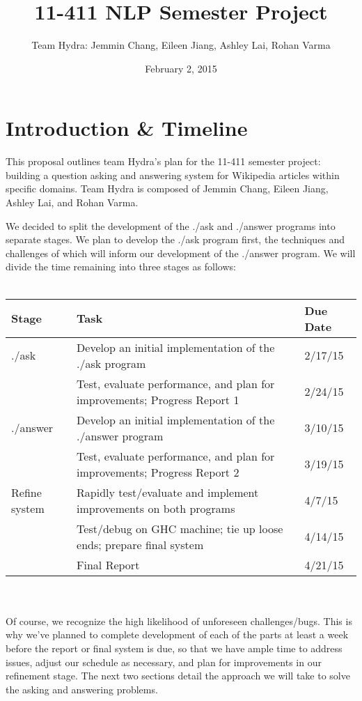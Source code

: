 \documentclass{article}
\begin{document}
\title{11-411 NLP Semester Project}
\date{February 2, 2015}
\author{Team Hydra: Jemmin Chang, Eileen Jiang, Ashley Lai, Rohan Varma}

\maketitle

\section{Introduction \& Timeline}
This proposal outlines team Hydra’s plan for the 11-411 semester project: building a question asking and answering system for Wikipedia articles within specific domains. Team Hydra is composed of Jemmin Chang, Eileen Jiang, Ashley Lai, and Rohan Varma.

We decided to split the development of the ./ask and ./answer programs into separate stages. We plan to develop the ./ask program first, the techniques and challenges of which will inform our development of the ./answer program. We will divide the time remaining into three stages as follows: \\
\\
\begin{tabular}{|l|l|l|}
  \hline
  \textbf{Stage} & \textbf{Task} & \textbf{Due Date} \\ \hline
  ./ask & Develop an initial implementation of the ./ask program & 2/17/15 \\ \cline{2-3}
  & Test, evaluate performance, and plan for improvements; Progress Report 1 & 2/24/15 \\ \hline
  ./answer & Develop an initial implementation of the ./answer program & 3/10/15 \\ \cline{2-3}
  & Test, evaluate performance, and plan for improvements; Progress Report 2 & 3/19/15 \\ \hline
  Refine system & Rapidly test/evaluate and implement improvements on both programs & 4/7/15 \\ \cline{2-3}
  & Test/debug on GHC machine; tie up loose ends; prepare final system & 4/14/15 \\ \cline{2-3}
  & Final Report & 4/21/15 \\ \hline
\end{tabular} \\
\\
Of course, we recognize the high likelihood of unforeseen challenges/bugs. This is why we’ve planned to complete development of each of the parts at least a week before the report or final system is due, so that we have ample time to address issues, adjust our schedule as necessary, and plan for improvements in our refinement stage. The next two sections detail the approach we will take to solve the asking and answering problems.
\end{document}
